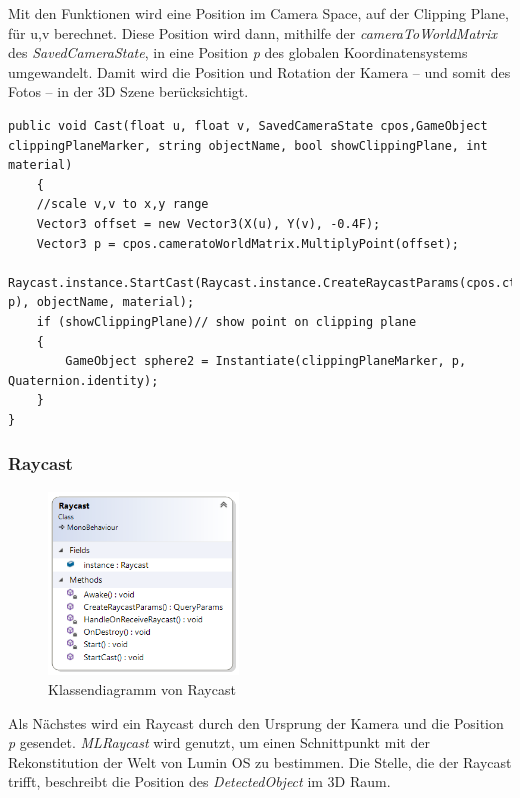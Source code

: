 Mit den Funktionen wird eine Position im Camera Space, auf der Clipping Plane, für u,v berechnet. Diese Position wird dann, mithilfe der \textit{cameraToWorldMatrix} des \textit{SavedCameraState}, in eine Position \textit{p} des globalen Koordinatensystems umgewandelt. Damit wird die Position und Rotation der Kamera – und somit des Fotos – in der 3D Szene berücksichtigt. %

\begin{lstlisting}
public void Cast(float u, float v, SavedCameraState cpos,GameObject clippingPlaneMarker, string objectName, bool showClippingPlane, int material)
	{
	//scale v,v to x,y range
	Vector3 offset = new Vector3(X(u), Y(v), -0.4F);
	Vector3 p = cpos.cameratoWorldMatrix.MultiplyPoint(offset);
	Raycast.instance.StartCast(Raycast.instance.CreateRaycastParams(cpos.ctransform, p), objectName, material);
	if (showClippingPlane)// show point on clipping plane
	{
		GameObject sphere2 = Instantiate(clippingPlaneMarker, p, Quaternion.identity);
	}
}
\end{lstlisting}

\subsubsection{Raycast}

\begin{figure}[H]
	\centering
	\includegraphics[width=0.45\textwidth]{images/dia_raycast.PNG}
	\caption[Klassendiagramm von Raycast]{Klassendiagramm von Raycast}
	\label{dia:raycast}
\end{figure}

Als Nächstes wird ein Raycast durch den Ursprung der Kamera und die Position \textit{p} gesendet. \textit{MLRaycast} wird genutzt, um einen Schnittpunkt mit der Rekonstitution der Welt von Lumin OS zu bestimmen. Die Stelle, die der Raycast trifft, beschreibt die Position des \textit{DetectedObject} im 3D Raum.

